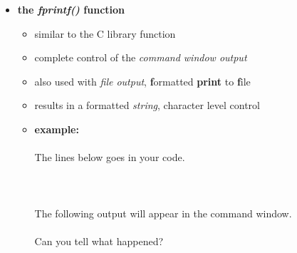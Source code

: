 \documentclass[11pt]{article}
\begin{document}
\begin{itemize}
\begin{itemize}
		       \item \textbf{ \Large the \LARGE{\it fprintf()} \Large function} \\
            	\Large
            	\begin{itemize}
            		\item similar to the C library function \\
            		\item complete control of the {\it command window output}	\\
            		\item also used with {\it file output}, {\bf f}ormatted {\bf print} to {\bf f}ile 	\\
            		\item results in a formatted {\it string}, character level control \\
            		
            		\item {\bf example:} \\\\
            						
            						The lines below goes in your code.  \vspace{10mm} \\			
            						 \\\\	
            						 \vspace{5mm} \\	
            						
            						The following output will appear in the command window.  \vspace{10mm} \\	
            						
            						 \vspace{5mm} \\
            				
            						Can you tell what happened?  \vspace{10mm} \\	
            						

\end{itemize}
\end{itemize}
\end{itemize}
\end{document}
